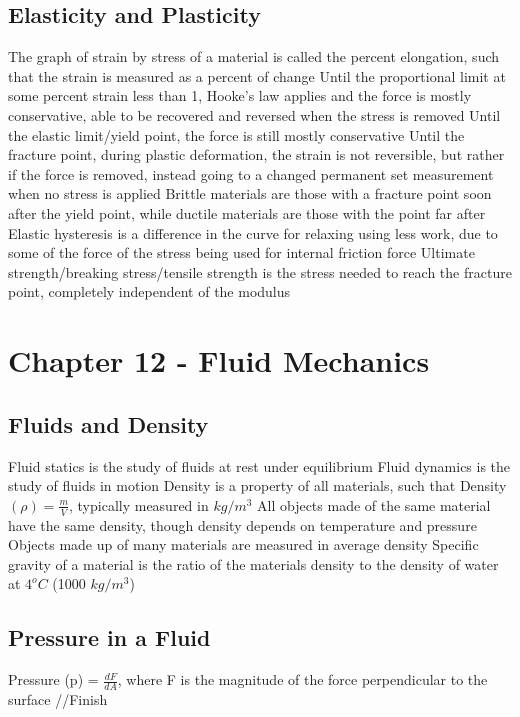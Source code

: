 \documentclass[11 pt, twoside]{article}
\newenvironment{outline*}
{
	\begin{outline}[enumerate]
	}
	{\end{outline}
}
\begin{document}
\subsection{Elasticity and Plasticity}
\begin{outline*}
\1 The graph of strain by stress of a material is called the percent elongation, such that the strain is measured as a percent of change
\1 Until the proportional limit at some percent strain less than 1, Hooke’s law applies and the force is mostly conservative, able to be recovered and reversed when the stress is removed
\1 Until the elastic limit/yield point, the force is still mostly conservative
\1 Until the fracture point, during plastic deformation, the strain is not reversible, but rather if the force is removed, instead going to a changed permanent set measurement when no stress is applied
\1 Brittle materials are those with a fracture point soon after the yield point, while ductile materials are those with the point far after
\1 Elastic hysteresis is a difference in the curve for relaxing using less work, due to some of the force of the stress being used for internal friction force
\1 Ultimate strength/breaking stress/tensile strength is the stress needed to reach the fracture point, completely independent of the modulus
\end{outline*}
\section{Chapter 12 - Fluid Mechanics}
\subsection{Fluids and Density}
\begin{outline*}
\1 Fluid statics is the study of fluids at rest under equilibrium
\1 Fluid dynamics is the study of fluids in motion
\1 Density is a property of all materials, such that Density $(\rho) = \frac{m}{V}$, typically measured in $kg/m^3$
\2 All objects made of the same material have the same density, though density depends on temperature and pressure
\2 Objects made up of many materials are measured in average density
\2 Specific gravity of a material is the ratio of the materials density to the density of water at $4^oC$ (1000 $kg/m^3$)
\end{outline*}
\subsection{Pressure in a Fluid}
\begin{outline*}
\1 Pressure (p) = $\frac{dF}{dA}$, where F is the magnitude of the force perpendicular to the surface
\1 //Finish
\end{outline*}
\end{document}
